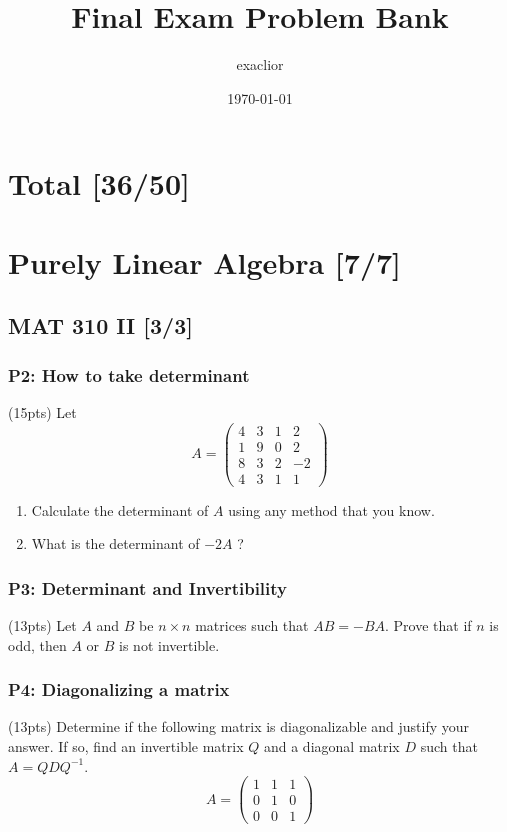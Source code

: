 \documentclass[11pt]{article}
\author{exaclior}
\date{\today}
\title{Final Exam Problem Bank}
\begin{document}
\maketitle
\tableofcontents

\section{Total [36/50]}
\label{sec:orgeda4888}

\section{Purely Linear Algebra [7/7]}
\label{sec:org3498124}
\subsection{MAT 310 II [3/3]}
\label{sec:org695e35a}
\subsubsection{P2: How to take determinant}
\label{sec:org8a2ad90}
(15pts) Let \[ A=\left(\begin{array}{cccc} 4 & 3 & 1 & 2 \\ 1 & 9 & 0 & 2 \\ 8 &
3 & 2 & -2 \\ 4 & 3 & 1 & 1 \end{array}\right) \]
\begin{enumerate}
\item Calculate the determinant of \(A\) using any method that you know.
\item What is the determinant of \(-2 A\) ?
\end{enumerate}
\subsubsection{P3: Determinant and Invertibility}
\label{sec:orgbc23e7b}
(13pts) Let \(A\) and \(B\) be \(n \times n\) matrices such that \(A B=-B A\).
Prove that if \(n\) is odd, then \(A\) or \(B\) is not invertible.
\subsubsection{P4: Diagonalizing a matrix}
\label{sec:org5563aa1}
(13pts) Determine if the following matrix is diagonalizable and justify your
answer. If so, find an invertible matrix \(Q\) and a diagonal matrix \(D\) such
that \(A=Q D Q^{-1}\).
\[ A=\left(\begin{array}{lll} 1 & 1 & 1 \\ 0 & 1 & 0 \\ 0
& 0 & 1 \end{array}\right) \]
\end{document}
